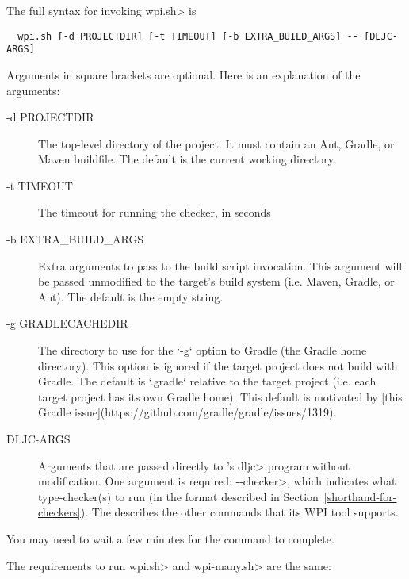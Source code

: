The full syntax for invoking \<wpi.sh> is

\begin{Verbatim}
  wpi.sh [-d PROJECTDIR] [-t TIMEOUT] [-b EXTRA_BUILD_ARGS] -- [DLJC-ARGS]
\end{Verbatim}

Arguments in square brackets are optional.
Here is an explanation of the arguments:

\begin{description}
\item[-d PROJECTDIR]
  The top-level directory of the project.  It must contain an Ant, Gradle,
  or Maven buildfile. The default is the current working directory.

\item[-t TIMEOUT]
  The timeout for running the checker, in seconds

\item[-b EXTRA\_BUILD\_ARGS]
  Extra arguments to pass to the build script invocation. This argument
  will be passed unmodified to the target's build system (i.e. Maven, Gradle,
  or Ant). The default is the empty string.

\item[-g GRADLECACHEDIR]
  The directory to use for the `-g` option to Gradle (the Gradle home
  directory). This option is ignored if the target project does not
  build with Gradle. The default is `.gradle` relative to the target
  project (i.e. each target project has its own Gradle home). This default
  is motivated by [this Gradle issue](https://github.com/gradle/gradle/issues/1319).

\item[DLJC-ARGS]
  Arguments that are passed directly to
  's
  \<dljc> program without
  modification.  One argument is required: \<-\relax-checker>, which indicates
  what type-checker(s) to run (in the format described in Section~\ref{shorthand-for-checkers}).
  The 
  describes the other commands that its WPI tool supports.
\end{description}

You may need to wait a few minutes for the command to complete.



The requirements to run \<wpi.sh> and \<wpi-many.sh> are the same:

